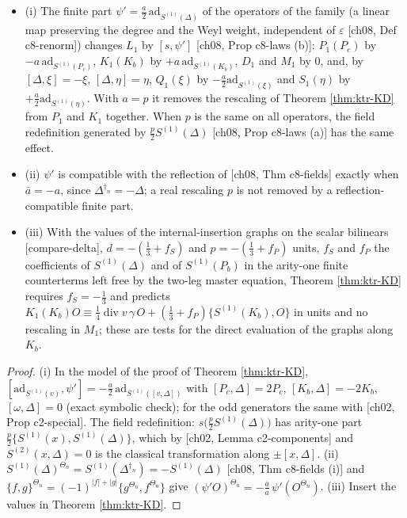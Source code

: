 \begin{proposition}
\label{prop:ktr-rescale}
\begin{itemize}
\item (i) The finite part $\psi'=\tfrac a2\,\mathrm{ad}_{S^{(1)}(\Delta)}$ of the operators of the family (a linear map preserving the degree and the Weyl weight, independent of $\varepsilon$ [ch08, Def c8-renorm]) changes $L_1$ by $[s,\psi']$ [ch08, Prop c8-laws (b)]: $P_1(P_c)$ by $-a\,\mathrm{ad}_{S^{(1)}(P_c)}$, $K_1(K_b)$ by $+a\,\mathrm{ad}_{S^{(1)}(K_b)}$, $D_1$ and $M_1$ by $0$, and, by $[\Delta,\xi]=-\xi$, $[\Delta,\eta]=\eta$, $Q_1(\xi)$ by $-\tfrac a2\mathrm{ad}_{S^{(1)}(\xi)}$ and $S_1(\eta)$ by $+\tfrac a2\mathrm{ad}_{S^{(1)}(\eta)}$. With $a=p$ it removes the rescaling of Theorem \ref{thm:ktr-KD} from $P_1$ and $K_1$ together. When $p$ is the same on all operators, the field redefinition generated by $\tfrac p2S^{(1)}(\Delta)$ [ch08, Prop c8-laws (a)] has the same effect.
\item (ii) $\psi'$ is compatible with the reflection of [ch08, Thm c8-fields] exactly when $\bar a=-a$, since $\Delta^{\dagger_n}=-\Delta$; a real rescaling $p$ is not removed by a reflection-compatible finite part.
\item (iii) With the values of the internal-insertion graphs on the scalar bilinears [compare-delta], $d=-(\tfrac13+f_S)$ and $p=-(\tfrac13+f_P)$ units, $f_S$ and $f_P$ the coefficients of $S^{(1)}(\Delta)$ and of $S^{(1)}(P_b)$ in the arity-one finite counterterms left free by the two-leg master equation, Theorem \ref{thm:ktr-KD} requires $f_S=-\tfrac13$ and predicts $K_1(K_b)O\equiv\tfrac14\operatorname{div}v\,\gamma\,O+(\tfrac13+f_P)\{S^{(1)}(K_b),O\}$ in units and no rescaling in $M_1$; these are tests for the direct evaluation of the graphs along $K_b$.
\end{itemize}
\end{proposition}

\begin{proof}
(i) In the model of the proof of Theorem \ref{thm:ktr-KD}, $[\mathrm{ad}_{S^{(1)}(v)},\psi']=-\tfrac a2\,\mathrm{ad}_{S^{(1)}([v,\Delta])}$ with $[P_c,\Delta]=2P_c$, $[K_b,\Delta]=-2K_b$, $[\omega,\Delta]=0$ (exact symbolic check); for the odd generators the same with [ch02, Prop c2-special]. The field redefinition: $s\big(\tfrac p2S^{(1)}(\Delta)\big)$ has arity-one part $\tfrac p2\{S^{(1)}(x),S^{(1)}(\Delta)\}$, which by [ch02, Lemma c2-components] and $S^{(2)}(x,\Delta)=0$ is the classical transformation along $\pm[x,\Delta]$. (ii) $S^{(1)}(\Delta)^{\Theta_n}=S^{(1)}(\Delta^{\dagger_n})=-S^{(1)}(\Delta)$ [ch08, Thm c8-fields (i)] and $\{f,g\}^{\Theta_n}=(-1)^{|f|+|g|}\{g^{\Theta_n},f^{\Theta_n}\}$ give $(\psi'O)^{\Theta_n}=-\tfrac{\bar a}a\,\psi'(O^{\Theta_n})$. (iii) Insert the values in Theorem \ref{thm:ktr-KD}.
\end{proof}

